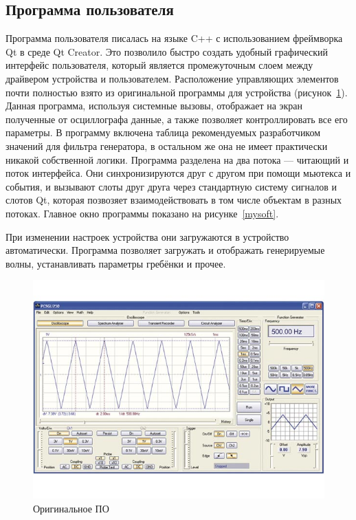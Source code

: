 \documentclass[a4paper,12pt]{report}
\numberwithin{equation}{section}
\begin{document}
\subsection{Программа пользователя}
Программа пользователя писалась на языке C++ с использованием фреймворка Qt в
среде Qt Creator. Это позволило быстро создать удобный графический интерфейс
пользователя, который является промежуточным слоем между драйвером устройства и
пользователем. Расположение управляющих элементов почти полностью взято из
оригинальной программы для устройства (рисунок~\ref{originalsoft}). Данная
программа, используя системные вызовы, отображает на экран полученные от
осциллографа данные, а также позволяет контроллировать все его параметры. В
программу включена таблица рекомендуемых разработчиком значений для фильтра
генератора, в остальном же она не имеет практически никакой собственной
логики. Программа разделена на два потока --- читающий и поток интерфейса. Они
синхронизируются друг с другом при помощи мьютекса и события, и вызывают слоты
друг друга через стандартную систему сигналов и слотов Qt, которая позвозяет
взаимодействовать в том числе объектам в разных потоках. Главное окно программы
показано на рисунке~\ref{mysoft}.

При изменении настроек устройства они загружаются в устройство
автоматически. Программа позволяет загружать и отображать генерируемые волны,
устанавливать параметры гребёнки и прочее.

\begin{figure}[h!]
\centering
\includegraphics[width=\textwidth]{originalsoft}
\caption{Оригинальное ПО}
\label{originalsoft}
\end{figure}
\end{document}
